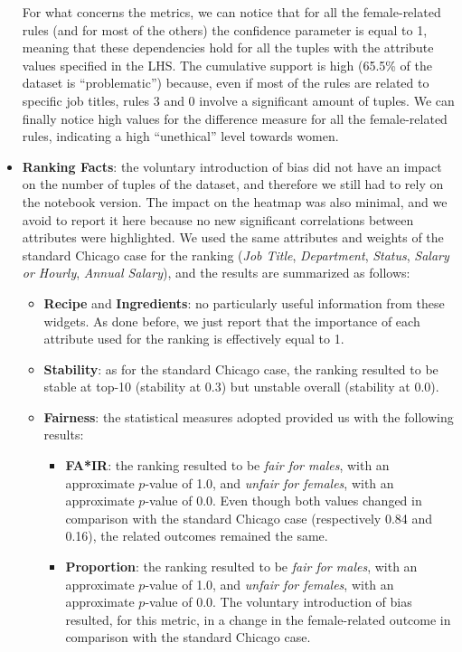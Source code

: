 \begin{itemize}
For what concerns the metrics, we can notice that for all the female-related rules (and for most of the others) the confidence parameter is equal to 1, meaning that these dependencies hold for all the tuples with the attribute values specified in the LHS. The cumulative support is high (65.5\% of the dataset is ``problematic'') because, even if most of the rules are related to specific job titles, rules 3 and 0 involve a significant amount of tuples. We can finally notice high values for the difference measure for all the female-related rules, indicating a high ``unethical'' level towards women.
\item \textbf{Ranking Facts}: the voluntary introduction of bias did not have an impact on the number of tuples of the dataset, and therefore we still had to rely on the notebook version. The impact on the heatmap was also minimal, and we avoid to report it here because no new significant correlations between attributes were highlighted. We used the same attributes and weights of the standard Chicago case for the ranking (\textit{Job Title}, \textit{Department}, \textit{Status}, \textit{Salary or Hourly}, \textit{Annual Salary}), and the results are summarized as follows:
\begin{itemize}
\item \textbf{Recipe} and \textbf{Ingredients}: no particularly useful information from these widgets. As done before, we just report that the importance of each attribute used for the ranking is effectively equal to 1.
\item \textbf{Stability}: as for the standard Chicago case, the ranking resulted to be stable at top-10 (stability at 0.3) but unstable overall (stability at 0.0).
\item \textbf{Fairness}: the statistical measures adopted provided us with the following results:
\begin{itemize}
\item \textbf{FA*IR}: the ranking resulted to be \textit{fair for males}, with an approximate \(p\)-value of 1.0, and \textit{unfair for females}, with an approximate \(p\)-value of 0.0. Even though both values changed in comparison with the standard Chicago case (respectively 0.84 and 0.16), the related outcomes remained the same.
\item \textbf{Proportion}: the ranking resulted to be \textit{fair for males}, with an approximate \(p\)-value of 1.0, and \textit{unfair for females}, with an approximate \(p\)-value of 0.0. The voluntary introduction of bias resulted, for this metric, in a change in the female-related outcome in comparison with the standard Chicago case.

\end{itemize}
\end{itemize}
\end{itemize}
